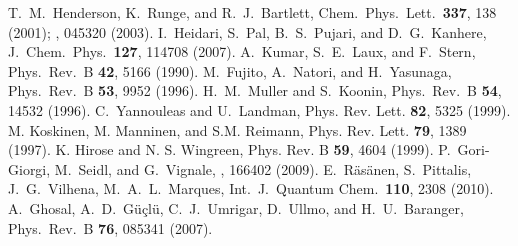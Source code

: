 \documentclass[twocolumn]{revtex4}
\begin{document}
\begin{thebibliography}{200}
 T.~M.~Henderson, K.~Runge, and R.~J.~Bartlett, Chem.~Phys.~Lett.~{\bf 337}, 138 (2001); , 045320 (2003).
 I.~Heidari, S.~Pal, B.~S.~Pujari, and D.~G.~Kanhere, J.~Chem.~Phys.~{\bf 127}, 
114708 (2007).
 A.~Kumar, S.~E.~Laux, and F.~Stern, Phys.~Rev.~B {\bf 42}, 5166 (1990).
 M.~Fujito, A.~Natori, and H.~Yasunaga, Phys.~Rev.~B {\bf 53}, 9952 (1996).
 H.~M.~Muller and S.~Koonin, Phys.~Rev.~B {\bf 54}, 14532 (1996).
 C.~Yannouleas and U.~Landman, Phys. Rev. Lett. {\bf 82}, 5325 (1999).
 M. Koskinen, M. Manninen, and S.M. Reimann, Phys. Rev. Lett. {\bf 79}, 1389 (1997).
 K. Hirose and N. S. Wingreen, Phys. Rev. B {\bf 59}, 4604 (1999).
 P.~Gori-Giorgi, M.~Seidl, and G.~Vignale, , 166402 (2009).
 E.~R\"as\"anen, S.~Pittalis, J.~G.~Vilhena, M.~A.~L.~Marques, Int.~J.~Quantum Chem.~{\bf 110}, 2308 (2010). 
 A.~Ghosal, A.~D.~G\"{u}\c{c}l\"{u}, C.~J.~Umrigar, D.~Ullmo, and H.~U.~Baranger, Phys.~Rev.~B {\bf 76}, 085341 (2007).

\end{thebibliography}
\end{document}
